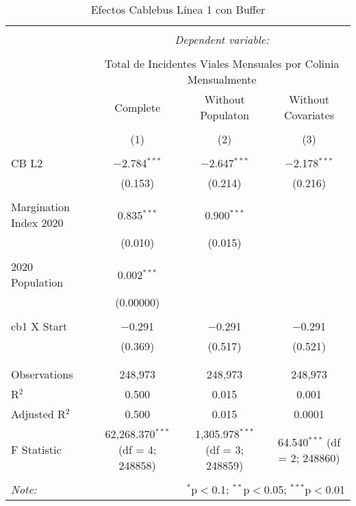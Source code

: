 
\begin{table}[!htbp] \centering 
  \caption{Efectos Cablebus Línea 1 con Buffer} 
  \label{} 
\begin{tabular}{@{\extracolsep{5pt}}lccc} 
\\[-1.8ex]\hline 
\hline \\[-1.8ex] 
 & \multicolumn{3}{c}{\textit{Dependent variable:}} \\ 
\cline{2-4} 
\\[-1.8ex] & \multicolumn{3}{c}{Total de Incidentes Viales Mensuales por Colinia Mensualmente} \\ 
 & Complete & Without Populaton & Without Covariates \\ 
\\[-1.8ex] & (1) & (2) & (3)\\ 
\hline \\[-1.8ex] 
 CB L2 & $-$2.784$^{***}$ & $-$2.647$^{***}$ & $-$2.178$^{***}$ \\ 
  & (0.153) & (0.214) & (0.216) \\ 
  & & & \\ 
 Margination Index 2020 & 0.835$^{***}$ & 0.900$^{***}$ &  \\ 
  & (0.010) & (0.015) &  \\ 
  & & & \\ 
 2020 Population & 0.002$^{***}$ &  &  \\ 
  & (0.00000) &  &  \\ 
  & & & \\ 
 cb1 X Start & $-$0.291 & $-$0.291 & $-$0.291 \\ 
  & (0.369) & (0.517) & (0.521) \\ 
  & & & \\ 
\hline \\[-1.8ex] 
Observations & 248,973 & 248,973 & 248,973 \\ 
R$^{2}$ & 0.500 & 0.015 & 0.001 \\ 
Adjusted R$^{2}$ & 0.500 & 0.015 & 0.0001 \\ 
F Statistic & 62,268.370$^{***}$ (df = 4; 248858) & 1,305.978$^{***}$ (df = 3; 248859) & 64.540$^{***}$ (df = 2; 248860) \\ 
\hline 
\hline \\[-1.8ex] 
\textit{Note:}  & \multicolumn{3}{r}{$^{*}$p$<$0.1; $^{**}$p$<$0.05; $^{***}$p$<$0.01} \\ 
\end{tabular} 
\end{table} 
